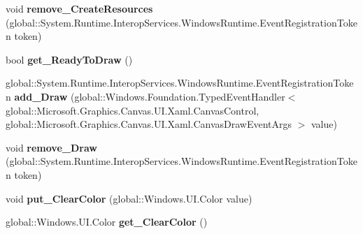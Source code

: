 \begin{DoxyCompactItemize}
\item 
\mbox{\label{class_microsoft_1_1_graphics_1_1_canvas_1_1_u_i_1_1_xaml_1_1_canvas_control_aee51056da35ed3fa259233ef54dda668}} 
void {\bfseries remove\+\_\+\+Create\+Resources} (global\+::\+System.\+Runtime.\+Interop\+Services.\+Windows\+Runtime.\+Event\+Registration\+Token token)
\item 
\mbox{\label{class_microsoft_1_1_graphics_1_1_canvas_1_1_u_i_1_1_xaml_1_1_canvas_control_a8c352fee2e45098d724d65a687a38126}} 
bool {\bfseries get\+\_\+\+Ready\+To\+Draw} ()
\item 
\mbox{\label{class_microsoft_1_1_graphics_1_1_canvas_1_1_u_i_1_1_xaml_1_1_canvas_control_a733ea4b79b9f0c15e8be4a4701c50a33}} 
global\+::\+System.\+Runtime.\+Interop\+Services.\+Windows\+Runtime.\+Event\+Registration\+Token {\bfseries add\+\_\+\+Draw} (global\+::\+Windows.\+Foundation.\+Typed\+Event\+Handler$<$ global\+::\+Microsoft.\+Graphics.\+Canvas.\+U\+I.\+Xaml.\+Canvas\+Control, global\+::\+Microsoft.\+Graphics.\+Canvas.\+U\+I.\+Xaml.\+Canvas\+Draw\+Event\+Args $>$ value)
\item 
\mbox{\label{class_microsoft_1_1_graphics_1_1_canvas_1_1_u_i_1_1_xaml_1_1_canvas_control_ad2a843f823ae97fdab81ae2b2e2564fa}} 
void {\bfseries remove\+\_\+\+Draw} (global\+::\+System.\+Runtime.\+Interop\+Services.\+Windows\+Runtime.\+Event\+Registration\+Token token)
\item 
\mbox{\label{class_microsoft_1_1_graphics_1_1_canvas_1_1_u_i_1_1_xaml_1_1_canvas_control_ac45e4aa28ab4d2147741f75260781cfa}} 
void {\bfseries put\+\_\+\+Clear\+Color} (global\+::\+Windows.\+U\+I.\+Color value)
\item 
\mbox{\label{class_microsoft_1_1_graphics_1_1_canvas_1_1_u_i_1_1_xaml_1_1_canvas_control_ac1780376dd163f47f7d16e7470b4e96f}} 
global\+::\+Windows.\+U\+I.\+Color {\bfseries get\+\_\+\+Clear\+Color} ()

\end{DoxyCompactItemize}
